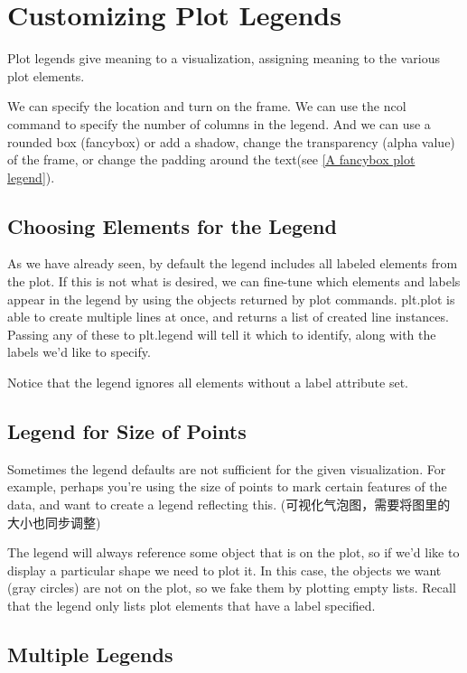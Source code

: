 \chapter{Customizing Plot Legends\label{Ch29}}
Plot legends give meaning to a visualization, assigning meaning to the various plot
elements.

We can specify the location and turn on the frame. We can use the ncol command to specify the number of columns in the legend. And we can use a rounded box (fancybox) or add a shadow, change the transparency
(alpha value) of the frame, or change the padding around the text(see \autoref{A fancybox plot legend}).

\section{Choosing Elements for the Legend}
As we have already seen, by default the legend includes all labeled elements from the
plot. If this is not what is desired, we can fine-tune which elements and labels appear
in the legend by using the objects returned by plot commands. plt.plot is able to
create multiple lines at once, and returns a list of created line instances. Passing any of
these to plt.legend will tell it which to identify, along with the labels we'd like to
specify.

Notice that the legend ignores all elements without a label attribute set.


\section{Legend for Size of Points}
Sometimes the legend defaults are not sufficient for the given visualization. For example, perhaps you're using the size of points to mark certain features of the data, and
want to create a legend reflecting this. (可视化气泡图，需要将图里的大小也同步调整)

The legend will always reference some object that is on the plot, so if we'd like to display a particular shape we need to plot it. In this case, the objects we want (gray circles) are not on the plot, so we fake them by plotting empty lists. Recall that the
legend only lists plot elements that have a label specified.

\section{Multiple Legends}

